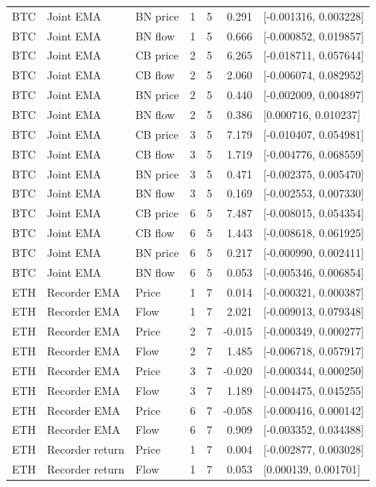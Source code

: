 {\begin{longtable}{lllrrrl}
BTC & Joint EMA & BN price & 1 & 5 & 0.291 & [-0.001316, 0.003228]\\
BTC & Joint EMA & BN flow & 1 & 5 & 0.666 & [-0.000852, 0.019857]\\
BTC & Joint EMA & CB price & 2 & 5 & 6.265 & [-0.018711, 0.057644]\\
BTC & Joint EMA & CB flow & 2 & 5 & 2.060 & [-0.006074, 0.082952]\\
BTC & Joint EMA & BN price & 2 & 5 & 0.440 & [-0.002009, 0.004897]\\
BTC & Joint EMA & BN flow & 2 & 5 & 0.386 & [0.000716, 0.010237]\\
BTC & Joint EMA & CB price & 3 & 5 & 7.179 & [-0.010407, 0.054981]\\
BTC & Joint EMA & CB flow & 3 & 5 & 1.719 & [-0.004776, 0.068559]\\
BTC & Joint EMA & BN price & 3 & 5 & 0.471 & [-0.002375, 0.005470]\\
BTC & Joint EMA & BN flow & 3 & 5 & 0.169 & [-0.002553, 0.007330]\\
BTC & Joint EMA & CB price & 6 & 5 & 7.487 & [-0.008015, 0.054354]\\
BTC & Joint EMA & CB flow & 6 & 5 & 1.443 & [-0.008618, 0.061925]\\
BTC & Joint EMA & BN price & 6 & 5 & 0.217 & [-0.000990, 0.002411]\\
BTC & Joint EMA & BN flow & 6 & 5 & 0.053 & [-0.005346, 0.006854]\\
ETH & Recorder EMA & Price & 1 & 7 & 0.014 & [-0.000321, 0.000387]\\
ETH & Recorder EMA & Flow & 1 & 7 & 2.021 & [-0.009013, 0.079348]\\
ETH & Recorder EMA & Price & 2 & 7 & -0.015 & [-0.000349, 0.000277]\\
ETH & Recorder EMA & Flow & 2 & 7 & 1.485 & [-0.006718, 0.057917]\\
ETH & Recorder EMA & Price & 3 & 7 & -0.020 & [-0.000344, 0.000250]\\
ETH & Recorder EMA & Flow & 3 & 7 & 1.189 & [-0.004475, 0.045255]\\
ETH & Recorder EMA & Price & 6 & 7 & -0.058 & [-0.000416, 0.000142]\\
ETH & Recorder EMA & Flow & 6 & 7 & 0.909 & [-0.003352, 0.034388]\\
ETH & Recorder return & Price & 1 & 7 & 0.004 & [-0.002877, 0.003028]\\
ETH & Recorder return & Flow & 1 & 7 & 0.053 & [0.000139, 0.001701]\\

\end{longtable}}

